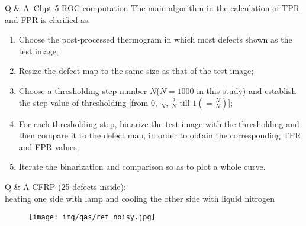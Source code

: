 \begin{frame}{Q \& A--Chpt 5 \small{ROC computation}}
The main algorithm in the calculation of TPR and FPR is clarified as:
\begin{enumerate}
   \item Choose the post-processed thermogram in which most defects shown as the test image;
   \item Resize the defect map to the same size as that of the test image;
   \item Choose a thresholding step number $N$($N=1000$ in this study) and establish the step value of thresholding [from $0$, $\frac{1}{N}$, $\frac{2}{N}$ till $1 (=\frac{N}{N})$];
   \item For each thresholding step, binarize the test image with the thresholding and then compare it to the defect map, in order to obtain the corresponding TPR and FPR values;
   \item Iterate the binarization and comparison so as to plot a whole curve.
\end{enumerate}
\end{frame}


\begin{frame}{Q \& A}
CFRP (25 defects inside):\\
heating one side with lamp and cooling the other side with liquid nitrogen 
  \begin{figure}
    \centering
    \texttt{[image: img/qas/ref\_noisy.jpg]}
  \end{figure}

\end{frame}
